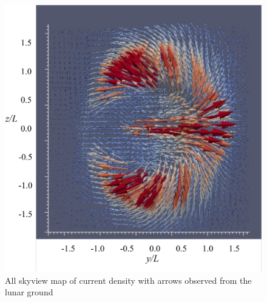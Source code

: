 \documentclass[draft,jgrga]{agutex2015}
\begin{document}
\begin{article}

\begin{figure}[h]
\centering
\noindent\includegraphics[width=12cm]{./figures/Fig_4_bb-crop.pdf}
\caption{All skyview map of current density with arrows 
observed from the lunar ground}\label{fig:4}
\end{figure}


\end{article}
\end{document}
